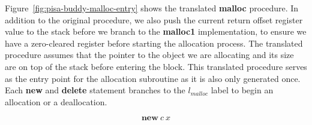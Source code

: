 Figure~\ref{fig:pisa-buddy-malloc-entry} shows the translated \textbf{malloc} procedure. In addition to the original procedure, we also push the current return offset register value to the stack before we branch to the \textbf{malloc1} implementation, to ensure we have a zero-cleared register before starting the allocation process. The translated procedure assumes that the pointer to the object we are allocating and its size are on top of the stack before entering the block. This translated procedure serves as the entry point for the allocation subroutine as it is also only generated once. Each \textbf{new} and \textbf{delete} statement branches to the $l_{malloc}$ label to begin an allocation or a deallocation.  

\begin{figure}[H]
    \centering
    \begin{subfigure}[t]{0.495\linewidth}
        \vskip 0pt
        \centering
        \begin{equation*} 
            \textbf{new}\ c\ x
        \end{equation*}
\end{subfigure}
\end{figure}
